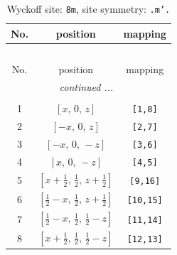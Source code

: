 \documentclass[fleqn,8pt]{jsarticle}
\begin{document}
\begin{longtable}{ccc}
\caption{Wyckoff site: {\tt 8m}, site symmetry: {\tt .m'.}}
 \\
 \hline \hline
No. & position & mapping \\ \hline \endfirsthead

\multicolumn{2}{l}{\tablename\ \thetable{}} \\
 \hline \hline
No. & position & mapping \\ \hline \endhead

 \hline \hline
\multicolumn{2}{r}{\footnotesize\it continued ...} \\ \endfoot

 \hline \hline
\multicolumn{2}{r}{} \\ \endlastfoot

1 & $\left[ x,\, 0,\, z \right]$ & {\tt [1,8]} \\ \hline
2 & $\left[ - x,\, 0,\, z \right]$ & {\tt [2,7]} \\ \hline
3 & $\left[ - x,\, 0,\, - z \right]$ & {\tt [3,6]} \\ \hline
4 & $\left[ x,\, 0,\, - z \right]$ & {\tt [4,5]} \\ \hline
5 & $\left[ x + \frac{1}{2},\, \frac{1}{2},\, z + \frac{1}{2} \right]$ & {\tt [9,16]} \\ \hline
6 & $\left[ \frac{1}{2} - x,\, \frac{1}{2},\, z + \frac{1}{2} \right]$ & {\tt [10,15]} \\ \hline
7 & $\left[ \frac{1}{2} - x,\, \frac{1}{2},\, \frac{1}{2} - z \right]$ & {\tt [11,14]} \\ \hline
8 & $\left[ x + \frac{1}{2},\, \frac{1}{2},\, \frac{1}{2} - z \right]$ & {\tt [12,13]} \\
\end{longtable}
\renewcommand{\arraystretch}{1.2}
\end{document}
